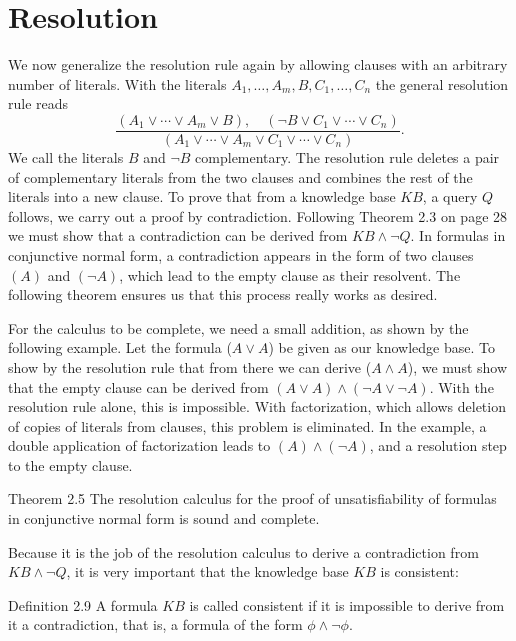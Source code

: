 \documentclass[10pt]{book}
\begin{document}
\section{Resolution}
We now generalize the resolution rule again by allowing clauses with an arbitrary number of literals. With the literals $A_{1}, \ldots, A_{m}, B, C_{1}, \ldots, C_{n}$ the general resolution rule reads
\begin{equation*}
\frac{\left(A_{1} \vee \cdots \vee A_{m} \vee B\right), \quad\left(\neg B \vee C_{1} \vee \cdots \vee C_{n}\right)}{\left(A_{1} \vee \cdots \vee A_{m} \vee C_{1} \vee \cdots \vee C_{n}\right)} . \tag{2.2}
\end{equation*}
We call the literals $B$ and $\neg B$ complementary. The resolution rule deletes a pair of complementary literals from the two clauses and combines the rest of the literals into a new clause.
To prove that from a knowledge base $K B$, a query $Q$ follows, we carry out a proof by contradiction. Following Theorem 2.3 on page 28 we must show that a contradiction can be derived from $K B \wedge \neg Q$. In formulas in conjunctive normal form, a contradiction appears in the form of two clauses $(A)$ and $(\neg A)$, which lead to the empty clause as their resolvent. The following theorem ensures us that this process really works as desired.

For the calculus to be complete, we need a small addition, as shown by the following example. Let the formula ($A \vee A$) be given as our knowledge base. To show by the resolution rule that from there we can derive ($A \wedge A$), we must show that the empty clause can be derived from $(A \vee A) \wedge (\neg A \vee \neg A)$. With the resolution rule alone, this is impossible. With factorization, which allows deletion of copies of literals from clauses, this problem is eliminated. In the example, a double application of factorization leads to $(A) \wedge (\neg A)$, and a resolution step to the empty clause.

\begin{displayquote}
Theorem 2.5 The resolution calculus for the proof of unsatisfiability of formulas in conjunctive normal form is sound and complete.
\end{displayquote}

Because it is the job of the resolution calculus to derive a contradiction from $K B \wedge \neg Q$, it is very important that the knowledge base $K B$ is consistent:

Definition 2.9 A formula $K B$ is called consistent if it is impossible to derive from it a contradiction, that is, a formula of the form $\phi \wedge \neg \phi$.
\end{document}
